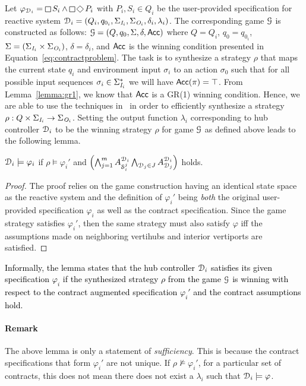Let $\varphi_{\design_i} = \LTLglobally S_i \wedge \LTLglobally \LTLfinally P_i$ with $P_i,S_i \in Q_i$ be the user-provided specification for reactive system $\mathcal{D}_i = (Q_i,q_{0_i},\Sigma_{\textit{I}_{i}},\Sigma_{\textit{O}_{i}},\delta_i,\lambda_i)$. The corresponding game $\mathcal{G}$ is constructed as follows: $\mathcal{G} = \left(Q,q_0, \Sigma, \delta,\mathsf{Acc} \right)$
where $Q = Q_i$, $q_{0} = q_{0_i}$, $\Sigma = (\Sigma_{\textit{I}_{i}} \times \Sigma_{\textit{O}_{i}})$, $\delta = \delta_i$, and $\mathsf{Acc}$ is the winning condition presented in Equation~\eqref{eq:contractproblem}. 
The task is to synthesize a strategy $\rho$ that maps the current state $q_i$ and environment input $\sigma_i$ to an action $\sigma_0$ such that for all possible input sequences $\sigma_i \in \Sigma_{\textit{I}_{i}}^*$ we will have $\mathsf{Acc}(\pi) = \top$.
From Lemma~\ref{lemma:gr1}, we know that $\mathsf{Acc}$ is a GR(1) winning condition. Hence, we are able to use the techniques in~\cite{bloem2012} in order to efficiently synthesize a strategy $\rho: Q\times\Sigma_{\textit{I}_{i}} \rightarrow \Sigma_{\textit{O}_{i}}$. Setting the output function $\lambda_i$ corresponding to hub controller $\mathcal{D}_i$ to be the winning strategy $\rho$ for game $\mathcal{G}$ as defined above  leads to the following lemma. 
\begin{lemma}
$\mathcal{D}_i \models \varphi_i$ if $\rho \models \varphi_i'$ and $ \left(\bigwedge_{j=1}^m A_{\mathcal{S}_i^j}^{\mathcal{D}_i} \bigwedge_{\mathcal{D}_j\in J} A_{\mathcal{D}_j}^{\mathcal{D}_i} \right)$ holds. 
\end{lemma}
\begin{proof}
The proof relies on the game construction having an identical state space as the reactive system and the definition of $\varphi_i'$ being \emph{both} the original user-provided specification $\varphi_i$ as well as the contract specification. Since the game strategy satisfies $\varphi_i'$, then the same strategy must also satisfy $\varphi$ iff the assumptions made on neighboring vertihubs and interior vertiports are satisfied.
\end{proof}
\textcolor{black}{Informally, the lemma states that the hub controller $\mathcal{D}_i$ satisfies its given specification $\varphi_i$ if the synthesized strategy $\rho$ from the game $\mathcal{G}$ is winning with respect to the contract augmented specification $\varphi_i'$ and the contract assumptions hold.}
\paragraph*{\textbf{Remark}} The above lemma is only a statement of \emph{sufficiency}. This is because the contract specifications that form $\varphi_i'$ are not unique. If $\rho \nvDash \varphi_i'$, for a particular set of contracts, this does not mean there does not exist a $\lambda_i$ such that $\mathcal{D}_i \models \varphi$.





